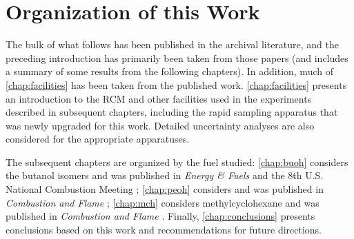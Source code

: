 \documentclass[../main.tex]{subfiles}
\begin{document}
\section{Organization of this Work}

The bulk of what follows has been published in the archival literature,
and the preceding introduction has primarily been taken from those
papers (and includes a summary of some results from the following
chapters). In addition, much of \cref{chap:facilities} has been
taken from the published work. \cref{chap:facilities} presents an
introduction to the RCM and other facilities used in the experiments
described in subsequent chapters, including the rapid sampling apparatus
that was newly upgraded for this work. Detailed uncertainty analyses
are also considered for the appropriate apparatuses.

The subsequent chapters are organized by the fuel studied:
\cref{chap:buoh} considers the butanol isomers and was published in
\textit{Energy \& Fuels} \cite{Weber2013} and the 8th U.S. National
Combustion Meeting \cite{Weber2013a}; \cref{chap:peoh} considers
\iPeOH{} and was published in \textit{Combustion and Flame}
\cite{Sarathy2013}; \cref{chap:mch} considers methylcyclohexane and was
published in \textit{Combustion and Flame} \cite{Weber2014}. Finally,
\cref{chap:conclusions} presents conclusions based on this work and
recommendations for future directions.
\end{document}

